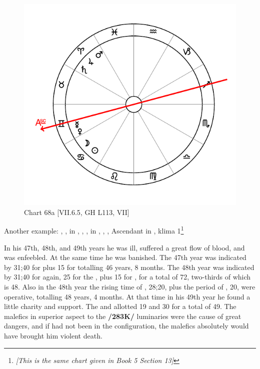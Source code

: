 \newpage
\begin{figure}
\centering
\vspace{0pt}
\includegraphics[width=.68\textwidth]{charts/5_10_13}
\caption{Chart 68a [VII.6.5, GH L113, VII]}
\label{fig:chart68a}
\end{figure} 

\noindent Another example: \Sun, \Moon, in \Cancer, \Saturn, \Jupiter, \Mars\xspace in \Aries, \Venus, \Mercury, Ascendant in \Gemini, klima 1\footnote{\textit{[This is the same chart given in Book 5 Section 13]}}

In his 47th, 48th, and 49th years he was ill, suffered a great flow of blood, and was enfeebled. At the same time he was banished. The 47th year was indicated by 31;40 for \Cancer\xspace plus 15 for
\Mars\xspace totalling 46 years, 8 months. The 48th year was indicated by 31;40 for \Cancer\xspace again, 25 for the \Moon, plus 15 for \Mars, for a total of 72, two-thirds of which is 48. Also in the 48th year the rising time of \Gemini, 28;20, plus the period of \Mercury, 20, were operative, totalling 48 years, 4 months. At that time in his 49th year he found a little charity and support. The \Sun\xspace and \Saturn\xspace allotted 19 and 30 for a total of 49. The malefics in superior aspect to the \textbf{/283K/} luminaries were the cause of great dangers, and if \Jupiter\xspace had not been in the configuration, the malefics absolutely would have brought him violent death. 

